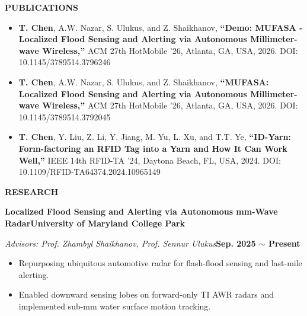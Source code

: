\documentclass[10pt, letterpaper]{article}
\newcommand{\resumesection}[1]{
  \vspace{0.75em}
  \begin{mdframed}[style=sectionstyle]
    \textbf{#1}
  \end{mdframed}
  \vspace{0.75em}
}
\newcommand{\cventry}[5]{ 
  \vspace{0em}
    \textbf{#1}\hfill\textbf{#2}
    \par
    \textit{#3}\hfill\textbf{#4}
    \par
  #5
  \vspace{0em}
}
\newenvironment{cvlist}{%
  \vspace{0em}
  \begin{itemize}[leftmargin=1em, itemsep=0em, topsep=0em, parsep=0em]}{
  \end{itemize}
  \vspace{0.5em}
}
\begin{document}

\resumesection{PUBLICATIONS}

\begin{cvlist}

  \item 
  \textbf{T. Chen}, A.W. Nazar, S. Ulukus, and Z. Shaikhanov, 
  \textbf{``Demo: MUFASA - Localized Flood Sensing and Alerting via Autonomous Millimeter-wave Wireless,''} 
  ACM 27th HotMobile '26, 
  Atlanta, GA, USA, 2026. 
  DOI: 10.1145/3789514.3796246

  \item 
  \textbf{T. Chen}, A.W. Nazar, S. Ulukus, and Z. Shaikhanov, 
  \textbf{``MUFASA: Localized Flood Sensing and Alerting via Autonomous Millimeter-wave Wireless,''} 
  ACM 27th HotMobile '26, 
  Atlanta, GA, USA, 2026. 
  DOI: 10.1145/3789514.3792045

  \item 
  \textbf{T. Chen}, Y. Liu, Z. Li, Y. Jiang, M. Yu, L. Xu, and T.T. Ye, 
  \textbf{``ID-Yarn: Form-factoring an RFID Tag into a Yarn and How It Can Work Well,''} 
  IEEE 14th RFID-TA '24, 
  Daytona Beach, FL, USA, 2024. 
  DOI: 10.1109/RFID-TA64374.2024.10965149
    
\end{cvlist}


\resumesection{RESEARCH}

\cventry
{Localized Flood Sensing and Alerting via Autonomous mm-Wave Radar}
{University of Maryland College Park}
{Advisors: Prof. Zhambyl Shaikhanov, Prof. Sennur Ulukus}
{Sep. 2025 $\sim$ Present}
{
  \begin{cvlist}
    \item Repurposing ubiquitous automotive radar for flash-flood sensing and last-mile alerting.
    \item Enabled downward sensing lobes on forward-only TI AWR radars and implemented sub-mm water surface motion tracking.
  \end{cvlist}
}

\end{document}

